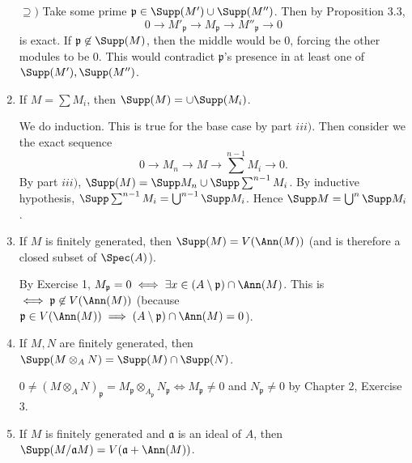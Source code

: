 \documentclass[a4paper]{exam}
\newif\ifhint
\begin{document}
\begin{questions}
\begin{enumerate}
\begin{solution}
		$\supseteq) $ Take some prime $\mathfrak{p} \in \Supp(M') \cup \Supp(M'')$.
		Then by Proposition 3.3,
		\[
			0 \to M'_{\mathfrak{p}} \to M_{\mathfrak{p}} \to M''_{\mathfrak{p}} \to 0
		\] 
		is exact.
		If $\mathfrak{p} \not\in\Supp(M)$, then the middle would be 0, forcing the other modules to be 0.
		This would contradict $\mathfrak{p} $'s presence in at least one of $\Supp(M'),\Supp(M'') $.
	\end{solution}
	\item If $M = \sum M_i $, then $\Supp(M) = \cup\Supp(M_i) $.
	\begin{solution}
		We do induction.
		This is true for the base case by part $iii) $.
		Then consider we the exact sequence
		\[
			0 \to M_{n} \to M \to \sum^{n-1} M_i \to 0
		.\] 
		By part $iii) $, $\Supp(M) = \Supp M_n \cup \Supp \sum^{n-1} M_i $.
		By inductive hypothesis, $\Supp \sum^{n-1} M_i = \bigcup^{n-1} \Supp M_i$.
		Hence $\Supp M = \bigcup^n \Supp M_i $.
	\end{solution}
	\item If $M $ is finitely generated, then $\Supp(M) = V(\Ann(M)) $ (and is therefore a closed subset of $\Spec(A) $).
	\begin{solution}
		By Exercise 1, $M_{\mathfrak{p}} = 0 \iff \exists x \in (A \setminus \mathfrak{p}) \cap \Ann(M) $.
		This is $\iff \mathfrak{p} \not \in V(\Ann(M)) $ (because $\mathfrak{p} \in V(\Ann(M)) \implies (A\setminus \mathfrak{p}) \cap \Ann(M) = 0 $).
	\end{solution}
	\item If $M,N $ are finitely generated, then $\Supp(M \otimes _A N) = \Supp(M) \cap \Supp(N)$.
		\ifhint
			Use Chapter 2, Exercise 3
		\fi
	\begin{solution}
		$0\ne (M \otimes_A N)_{\mathfrak{p}} = M_{\mathfrak{p}} \otimes_{A_{\mathfrak{p}}} N_{\mathfrak{p}} \iff M_{\mathfrak{p}} \ne 0$ and $N_{\mathfrak{p}} \ne 0 $ by Chapter 2, Exercise 3.
	\end{solution}
	\item If $M $ is finitely generated and $\mathfrak{a} $ is an ideal of $A $, then $\Supp(M / \mathfrak{a}M) = V(\mathfrak{a} + \Ann(M)) $.

\end{enumerate}
\end{questions}
\end{document}
